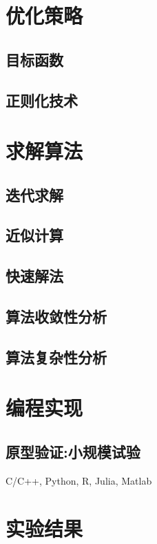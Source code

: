 \documentclass[UTF8,12pt]{ctexart}
\begin{document}
\newpage
\section{优化策略}

\subsection{目标函数}

\subsection{正则化技术}

\newpage
\section{求解算法}

\subsection{迭代求解}

\subsection{近似计算}

\subsection{快速解法}

\subsection{算法收敛性分析}

\subsection{算法复杂性分析}

\newpage
\section{编程实现}

\subsection{原型验证:小规模试验}

C/C++, Python, R, Julia, Matlab

\newpage
\section{实验结果}
\end{document}
